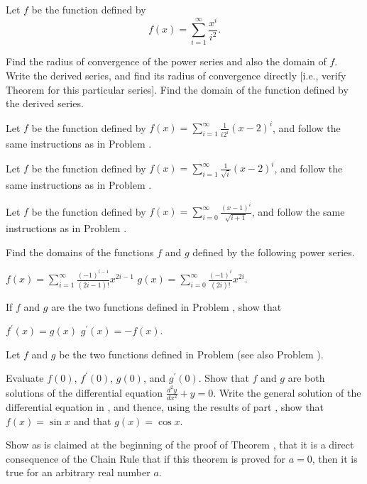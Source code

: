 \begin{exercises}

Let $f$ be the function defined by
\[
f(x) = \sum_{i=1}^\infty \frac{x^i}{i^2}.
\]
\begin{exenum}
\x
Find the radius of convergence of the power series
and also the domain of $f$.
\x
Write the derived series, and find its radius of
convergence directly
[i.e., verify Theorem  for
this particular series].
\x
Find the domain of the function defined
by the derived series.
\end{exenum}

Let $f$ be the function defined by
$f(x) = \sum_{i=1}^\infty \frac1{i2^i} (x-2)^i$,
and follow the same instructions as in
Problem .

Let $f$ be the function defined by
$f(x) = \sum_{i=1}^\infty \frac1{\sqrt{i}} (x-2)^i$,
and follow the same instructions as in
Problem .

Let $f$ be the function defined by
$f(x) = \sum_{i=0}^\infty \frac{(x-1)^i}{\sqrt{i+1}}$,
and follow the same instructions as in
Problem .

Find the domains of the functions $f$ and $g$
defined by the following power series.
\begin{exenum}
\x
$f(x) = \sum_{i=1}^\infty \frac{(-1)^{i-1}}
{(2i-1)!} x^{2i-1}$
\x
$g(x) = \sum_{i=0}^\infty \frac{(-1)^{i}}
{(2i)!} x^{2i}$.
\end{exenum}

If $f$ and $g$ are the two functions defined
in Problem , show that
\begin{exenum}
\x
$f^\prime (x) = g(x)$
\x
$g^\prime (x) = - f(x)$.
\end{exenum}

Let $f$ and $g$ be the two functions defined in
Problem  (see also Problem ).
\begin{exenum}
\x
{}
Evaluate $f(0)$, $f^\prime(0)$, $g(0)$,
and $g^\prime(0)$.
\x
{}
Show that $f$ and $g$ are both solutions of the
differential equation $\frac{d^2y}{dx^2} + y = 0$.
\x
Write the general solution of the differential equation
in , and thence, using the results of
part , show that $f(x) = \sin x$
and that $g(x) = \cos x$.
\end{exenum}

Show as is claimed at the beginning of the proof
of Theorem , that it is a direct
consequence of the Chain Rule that if this
theorem is proved for $a=0$, then it is
true for an arbitrary real number $a$.


\end{exercises}
